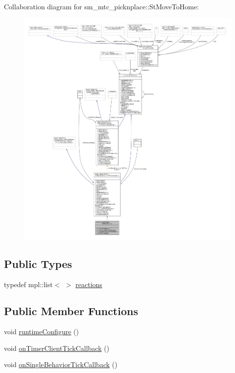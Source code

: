 Collaboration diagram for sm\+\_\+mtc\+\_\+picknplace\+:\+:St\+Move\+To\+Home\+:
\nopagebreak
\begin{figure}[H]
\begin{center}
\leavevmode
\includegraphics[width=350pt]{structsm__mtc__picknplace_1_1StMoveToHome__coll__graph}
\end{center}
\end{figure}
\subsection*{Public Types}
\begin{DoxyCompactItemize}
\item 
typedef mpl\+::list$<$  $>$ \hyperlink{structsm__mtc__picknplace_1_1StMoveToHome_ace089f0b355f84823c308e0e7d79ea16}{reactions}
\end{DoxyCompactItemize}
\subsection*{Public Member Functions}
\begin{DoxyCompactItemize}
\item 
void \hyperlink{structsm__mtc__picknplace_1_1StMoveToHome_a7cafbff041d36ba4d3cbc1147f294a23}{runtime\+Configure} ()
\item 
void \hyperlink{structsm__mtc__picknplace_1_1StMoveToHome_adbd13708067b1a190dc1e414291b436c}{on\+Timer\+Client\+Tick\+Callback} ()
\item 
void \hyperlink{structsm__mtc__picknplace_1_1StMoveToHome_a6b9cf2b7da8ebdac16e8d881fc2c069c}{on\+Single\+Behavior\+Tick\+Callback} ()
\end{DoxyCompactItemize}
